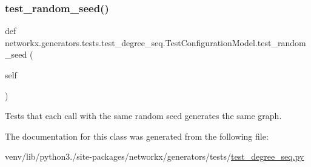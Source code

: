 \subsubsection{\texorpdfstring{test\+\_\+random\+\_\+seed()}{test\_random\_seed()}}
{\footnotesize\ttfamily def networkx.\+generators.\+tests.\+test\+\_\+degree\+\_\+seq.\+Test\+Configuration\+Model.\+test\+\_\+random\+\_\+seed (\begin{DoxyParamCaption}\item[{}]{self }\end{DoxyParamCaption})}

\begin{DoxyVerb}Tests that each call with the same random seed generates the
same graph.\end{DoxyVerb}
 

The documentation for this class was generated from the following file\+:\begin{DoxyCompactItemize}
\item 
venv/lib/python3./site-\/packages/networkx/generators/tests/\hyperlink{test__degree__seq_8py}{test\+\_\+degree\+\_\+seq.\+py}\end{DoxyCompactItemize}
